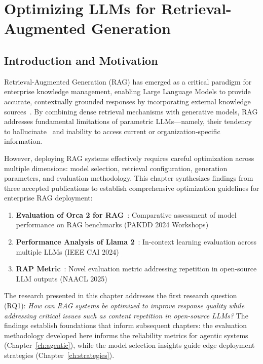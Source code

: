 \chapter{Optimizing LLMs for Retrieval-Augmented Generation}
\label{ch:rag}

\section{Introduction and Motivation}
\label{sec:rag_intro}

Retrieval-Augmented Generation (RAG) has emerged as a critical paradigm for enterprise knowledge management, enabling Large Language Models to provide accurate, contextually grounded responses by incorporating external knowledge sources~\cite{lewis2020rag}. By combining dense retrieval mechanisms with generative models, RAG addresses fundamental limitations of parametric LLMs---namely, their tendency to hallucinate~\cite{huang2023hallucination} and inability to access current or organization-specific information.

However, deploying RAG systems effectively requires careful optimization across multiple dimensions: model selection, retrieval configuration, generation parameters, and evaluation methodology. This chapter synthesizes findings from three accepted publications to establish comprehensive optimization guidelines for enterprise RAG deployment:

\begin{enumerate}[leftmargin=*]
    \item \textbf{Evaluation of Orca 2 for RAG}~\cite{huang2024orca2rag}: Comparative assessment of model performance on RAG benchmarks (PAKDD 2024 Workshops)
    \item \textbf{Performance Analysis of Llama 2}~\cite{huang2024llama2}: In-context learning evaluation across multiple LLMs (IEEE CAI 2024)
    \item \textbf{RAP Metric}~\cite{huang2025rap}: Novel evaluation metric addressing repetition in open-source LLM outputs (NAACL 2025)
\end{enumerate}

The research presented in this chapter addresses the first research question (RQ1): \textit{How can RAG systems be optimized to improve response quality while addressing critical issues such as content repetition in open-source LLMs?} The findings establish foundations that inform subsequent chapters: the evaluation methodology developed here informs the reliability metrics for agentic systems (Chapter~\ref{ch:agentic}), while the model selection insights guide edge deployment strategies (Chapter~\ref{ch:strategies}).

